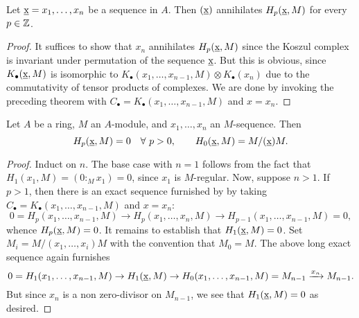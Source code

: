 \begin{corollary}
    Let $\underbar{x} = x_1,\dots,x_n$ be a sequence in $A$. Then $(\underbar{x})$ annihilates $H_p(\underbar{x}, M)$ for every $p\in\mathbb{Z}$.
\end{corollary}
\begin{proof}
    It suffices to show that $x_n$ annihilates $H_p(\underbar{x}, M)$ since the Koszul complex is invariant under permutation of the sequence $\underbar{x}$. But this is obvious, since $K_\bullet(\underbar{x}, M)$ is isomorphic to $K_\bullet(x_1,\dots,x_{n - 1}, M)\otimes K_\bullet(x_n)$ due to the commutativity of tensor products of complexes. We are done by invoking the preceding theorem with $C_\bullet = K_\bullet(x_1,\dots,x_{n - 1}, M)$ and $x = x_n$.
\end{proof}

\begin{theorem}
    Let $A$ be a ring, $M$ an $A$-module, and $x_1,\dots,x_n$ an $M$-sequence. Then 
    \begin{equation*}
        H_p(\underbar{x}, M) = 0\quad\forall~p > 0,\qquad H_0(\underbar{x}, M) = M/(\underbar{x})M.
    \end{equation*}
\end{theorem}
\begin{proof}
    Induct on $n$. The base case with $n = 1$ follows from the fact that $H_1(x_1, M) = (0 :_M x_1) = 0$, since $x_1$ is $M$-regular. Now, suppose $n > 1$. If $p > 1$, then there is an exact sequence furnished by  by taking $C_\bullet = K_\bullet(x_1,\dots,x_{n - 1}, M)$ and $x = x_n$:
    \begin{equation*}
        0 = H_p(x_1,\dots,x_{n - 1}, M)\longrightarrow H_p(x_1,\dots,x_n, M)\longrightarrow H_{p - 1}(x_1,\dots,x_{n - 1}, M) = 0,
    \end{equation*}
    whence $H_p(\underbar{x}, M) = 0$. It remains to establish that $H_1(\underbar{x}, M) = 0$. Set $M_i = M/(x_1,\dots,x_i)M$ with the convention that $M_0 = M$. The above long exact sequence again furnishes 
    \begin{equation*}
        0 = H_1(x_1,\dots,x_{n - 1}, M)\to H_1(\underbar{x}, M)\to H_0(x_1,\dots,x_{n - 1}, M) = M_{n - 1}\xrightarrow{x_n} M_{n - 1}.
    \end{equation*}
    But since $x_n$ is a non zero-divisor on $M_{n - 1}$, we see that $H_1(\underbar{x}, M) = 0$ as desired.
\end{proof}

